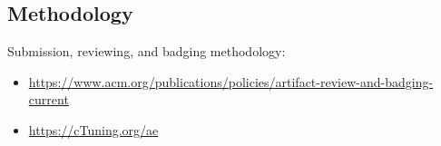 \subsection{Methodology}

Submission, reviewing, and badging methodology:

\begin{itemize}
  \item \url{https://www.acm.org/publications/policies/artifact-review-and-badging-current}
  \item \url{https://cTuning.org/ae}
\end{itemize}


